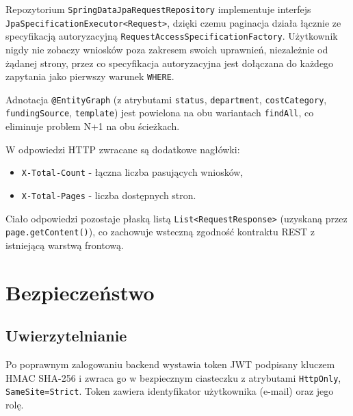 \documentclass[12pt,a4paper]{article}
\begin{document}
Repozytorium \texttt{SpringDataJpaRequestRepository} implementuje interfejs
\texttt{JpaSpecificationExecutor<Request>}, dzięki czemu paginacja działa
łącznie ze specyfikacją autoryzacyjną \texttt{RequestAccessSpecificationFactory}.
Użytkownik nigdy nie zobaczy wniosków poza zakresem swoich uprawnień,
niezależnie od żądanej strony, przez co specyfikacja autoryzacyjna jest dołączana
do każdego zapytania jako pierwszy warunek \texttt{WHERE}.

Adnotacja \texttt{@EntityGraph} (z atrybutami \texttt{status}, \texttt{department},
\texttt{costCategory}, \texttt{fundingSource}, \texttt{template}) jest powielona
na obu wariantach \texttt{findAll}, co eliminuje problem N+1 na obu ścieżkach.

W odpowiedzi HTTP zwracane są dodatkowe nagłówki:
\begin{itemize}[leftmargin=*]
  \item \texttt{X-Total-Count} - łączna liczba pasujących wniosków,
  \item \texttt{X-Total-Pages} - liczba dostępnych stron.
\end{itemize}
Ciało odpowiedzi pozostaje płaską listą \texttt{List<RequestResponse>}
(uzyskaną przez \texttt{page.getContent()}), co zachowuje wsteczną zgodność
kontraktu REST z istniejącą warstwą frontową.

\section{Bezpieczeństwo}
\label{sec:bezp}

\subsection{Uwierzytelnianie}
Po poprawnym zalogowaniu backend wystawia token JWT podpisany kluczem HMAC SHA-256
i zwraca go w bezpiecznym ciasteczku z atrybutami \texttt{HttpOnly}, \texttt{SameSite=Strict}.
Token zawiera identyfikator użytkownika (e-mail) oraz jego rolę.
\end{document}
